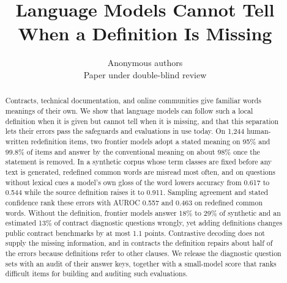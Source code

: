 \documentclass{article}
\title{Language Models Cannot Tell\\ When a Definition Is Missing}
\author{Anonymous authors\\Paper under double-blind review}
\begin{document}
\maketitle
\begin{abstract}
Contracts, technical documentation, and online communities give familiar words meanings of their own. We show that language models can follow such a local definition when it is given but cannot tell when it is missing, and that this separation lets their errors pass the safeguards and evaluations in use today. On 1,244 human-written redefinition items, two frontier models adopt a stated meaning on 95\% and 99.8\% of items and answer by the conventional meaning on about 98\% once the statement is removed. In a synthetic corpus whose term classes are fixed before any text is generated, redefined common words are misread most often, and on questions without lexical cues a model's own gloss of the word lowers accuracy from 0.617 to 0.544 while the source definition raises it to 0.911. Sampling agreement and stated confidence rank these errors with AUROC 0.557 and 0.463 on redefined common words. Without the definition, frontier models answer 18\% to 29\% of synthetic and an estimated 13\% of contract diagnostic questions wrongly, yet adding definitions changes public contract benchmarks by at most 1.1 points. Contrastive decoding does not supply the missing information, and in contracts the definition repairs about half of the errors because definitions refer to other clauses. We release the diagnostic question sets with an audit of their answer keys, together with a small-model score that ranks difficult items for building and auditing such evaluations.
\end{abstract}

%
%
%
%
%
%
%
%
%
%
%
%


\clearpage\appendix

\end{document}
